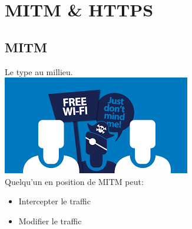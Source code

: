 \section{MITM \& HTTPS}

\subsection{MITM}
\begin{frame}
\begin{center}
Le type au millieu.\\
\includegraphics[scale=0.80]{res/mitm}\\
Quelqu'un en position de MITM peut:
\begin{itemize}
    \item Intercepter le traffic
    \item Modifier le traffic
\end{itemize}
\end{center}
\end{frame}



